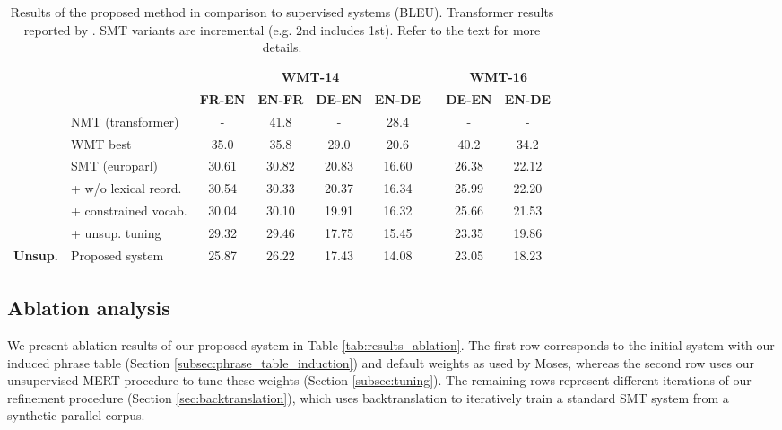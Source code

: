 \documentclass[11pt,a4paper]{article}
\begin{document}
\begin{table*}[t]
\begin{center}
  \begin{tabular}{clccccccc}
    \toprule
    & & \multicolumn{4}{c}{\bf WMT-14} & & \multicolumn{2}{c}{\bf WMT-16} \\
    \cmidrule{3-6} \cmidrule{8-9}
    & & \multicolumn{1}{c}{\bf FR-EN} & \multicolumn{1}{c}{\bf EN-FR} & \multicolumn{1}{c}{\bf DE-EN} & \multicolumn{1}{c}{\bf EN-DE} & & \multicolumn{1}{c}{\bf DE-EN} & \multicolumn{1}{c}{\bf EN-DE} \\
    \midrule
    \bf \multirow{7}{*}{Supervised} & NMT (transformer) & - & 41.8 & - & 28.4 & & - & - \\
    \cmidrule{2-9}
    & WMT best & 35.0 & 35.8 & 29.0 & 20.6 & & 40.2 & 34.2 \\
    \cmidrule{2-9}
    & SMT (europarl) & 30.61 & 30.82 & 20.83 & 16.60 & & 26.38 & 22.12 \\
    & + w/o lexical reord. & 30.54 & 30.33 & 20.37 & 16.34 & & 25.99 & 22.20 \\
    & + constrained vocab. & 30.04 & 30.10 & 19.91 & 16.32 & & 25.66 & 21.53 \\
    & + unsup. tuning & 29.32 & 29.46 & 17.75 & 15.45 & & 23.35 & 19.86 \\
    \midrule
    \bf Unsup. & Proposed system & 25.87 & 26.22 & 17.43 & 14.08 & & 23.05 & 18.23 \\
    \bottomrule
  \end{tabular}
\end{center}
\caption{Results of the proposed method in comparison to supervised systems (BLEU). Transformer results reported by \citet{vaswani2017attention}. SMT variants are incremental (e.g. 2nd includes 1st). Refer to the text for more details.}
\label{tab:results_supervised}
\end{table*}


\subsection{Ablation analysis} \label{subsec:results_ablation}

We present ablation results of our proposed system in Table \ref{tab:results_ablation}. The first row corresponds to the initial system with our induced phrase table (Section \ref{subsec:phrase_table_induction}) and default weights as used by Moses, whereas the second row uses our unsupervised MERT procedure to tune these weights (Section \ref{subsec:tuning}). The remaining rows represent different iterations of our refinement procedure (Section \ref{sec:backtranslation}), which uses backtranslation to iteratively train a standard SMT system from a synthetic parallel corpus.
\end{document}
